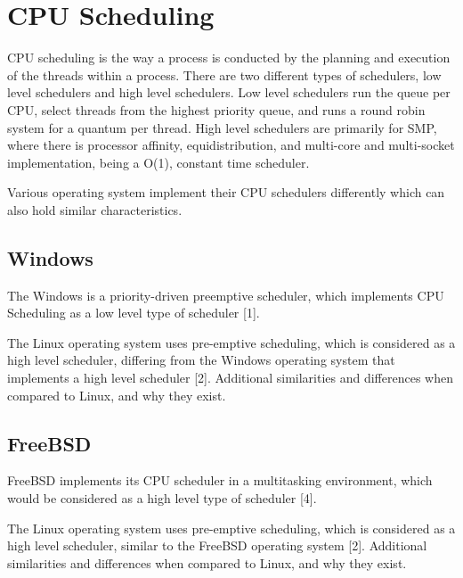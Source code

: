 \documentclass[letterpaper,10pt,onecolumn]{report}
\begin{document}
\section*{CPU Scheduling}
CPU scheduling is the way a process is conducted by the planning and execution of the threads within a process. There are two different types of schedulers, low level schedulers and high level schedulers. Low level schedulers run the queue per CPU, select threads from the highest priority queue, and runs a round robin system for a quantum per thread. High level schedulers are primarily for SMP, where there is processor affinity, equidistribution, and multi-core and multi-socket implementation, being a O(1), constant time scheduler.
\par \noindent
Various operating system implement their CPU schedulers differently which can also hold similar characteristics.

	\subsection*{Windows}
	The Windows is a priority-driven preemptive scheduler, which implements CPU Scheduling as a low level type of scheduler [1].
	
	\par \noindent
	The Linux operating system uses pre-emptive scheduling, which is considered as a high level scheduler, differing from the Windows operating system that implements a high level scheduler [2].
	Additional similarities and differences when compared to Linux, and why they exist.

	\subsection*{FreeBSD}
	FreeBSD implements its CPU scheduler in a multitasking environment, which would be considered as a high level type of scheduler [4].
	
	\par \noindent
	The Linux operating system uses pre-emptive scheduling, which is considered as a high level scheduler, similar to the FreeBSD operating system [2].
	Additional similarities and differences when compared to Linux, and why they exist.
\end{document}
